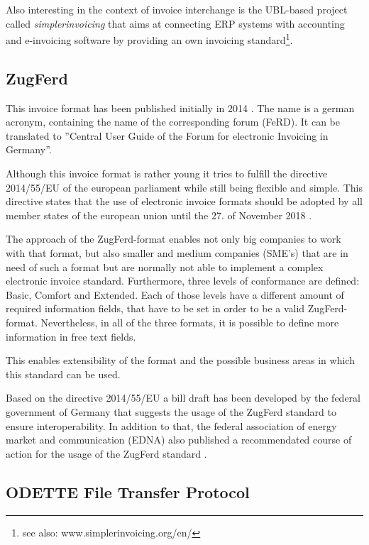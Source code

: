 Also interesting in the context of invoice interchange is the UBL-based project called \emph{simplerinvoicing} that aims at connecting ERP systems with accounting and e-invoicing software by providing an own invoicing standard\footnote {see also: www.simplerinvoicing.org/en/}. 

\subsection{ZugFerd}
\label{sec2.1.4}

This invoice format has been published initially in 2014 \cite{Ferd14}. The name is a german acronym, containing the name of the corresponding forum (FeRD). It can be translated to ''Central User Guide of the Forum for electronic Invoicing in Germany''. 

Although this invoice format is rather young it tries to fulfill the directive 2014/55/EU of the european parliament \cite{eu14} while still being flexible and simple. This directive states that the use of electronic invoice formats should be adopted by all member states of the european union until the 27. of November 2018 \cite[article 11]{eu14}. 
 
The approach of the ZugFerd-format enables not only big companies to work with that format, but also smaller and medium companies (SME's) that are in need of such a format but are normally not able to implement a complex electronic invoice standard. 
Furthermore, three levels of conformance are defined: Basic, Comfort and Extended. Each of those levels have a different amount of required information fields, that have to be set in order to be a valid ZugFerd-format. Nevertheless, in all of the three formats, it is possible to define more information in free text fields. 

This enables extensibility of the format and the possible business areas in which this standard can be used.

Based on the directive 2014/55/EU \cite{eu14} a bill draft has been developed by the federal government of Germany \cite[page 10]{br16} that suggests the usage of the ZugFerd standard to ensure interoperability. In addition to that, the federal association of energy market and communication (EDNA) also published a recommendated course of action for the usage of the ZugFerd standard \cite{edna16}.

\subsection{ODETTE File Transfer Protocol}
\label{sec2.1.5}

